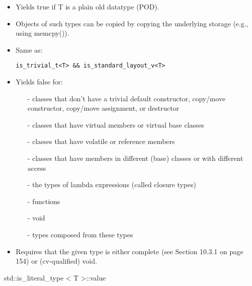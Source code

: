 \begin{itemize}
\item 
Yields true if T is a plain old datatype (POD).

\item 
Objects of such types can be copied by copying the underlying storage (e.g., using memcpy()).

\item
Same as: 
\begin{lstlisting}[style=styleCXX]
is_trivial_t<T> && is_standard_layout_v<T>
\end{lstlisting}

\item
Yields false for:

\begin{itemize}
\item [-]
classes that don’t have a trivial default constructor, copy/move constructor, copy/move assignment, or destructor

\item [-]
classes that have virtual members or virtual base classes

\item [-]
classes that have volatile or reference members

\item [-]
classes that have members in different (base) classes or with different access

\item [-]
the types of lambda expressions (called closure types)

\item [-]
functions

\item [-]
void

\item [-]
types composed from these types
\end{itemize}

\item
Requires that the given type is either complete (see Section 10.3.1 on page 154) or (cv-qualified) void.
\end{itemize}

std::is\_literal\_type < T >::value

